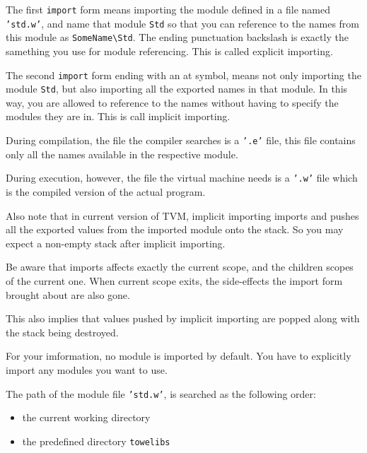 \documentclass{report}
\newcommand{\mstd}[1]{\texttt{#1\textbackslash Std}}
\begin{document}
The first \texttt{import} form means importing the module defined in a file named \texttt{'std.w'}, and name that module \texttt{Std} so that you can reference to the names from this module as \mstd{SomeName}. The ending punctuation backslash is exactly the samething you use for module referencing. This is called explicit importing.

The second \texttt{import} form ending with an at symbol, means not only importing the module \texttt{Std}, but also importing all the exported names in that module. In this way, you are allowed to reference to the names without having to specify the modules they are in. This is call implicit importing.

\begin{mdframed}[style=detail]
  During compilation, the file the compiler searches is a \texttt{'.e'} file, this file contains only all the names available in the respective module.

  During execution, however, the file the virtual machine needs is a \texttt{'.w'} file which is the compiled version of the actual program.

  Also note that in current version of TVM, implicit importing imports and pushes all the exported values from the imported module onto the stack. So you may expect a non-empty stack after implicit importing.
\end{mdframed}

\begin{mdframed}[style=detail]
  Be aware that imports affects exactly the current scope, and the children scopes of the current one. When current scope exits, the side-effects the import form brought about are also gone.

  This also implies that values pushed by implicit importing are popped along with the stack being destroyed.
\end{mdframed}

\begin{mdframed}[style=hint]
  For your imformation, no module is imported by default. You have to explicitly import any modules you want to use.
\end{mdframed}

The path of the module file \texttt{'std.w'}, is searched as the following order:
\begin{itemize}
\item the current working directory
\item the predefined directory \texttt{towelibs}
\end{itemize}
\end{document}
